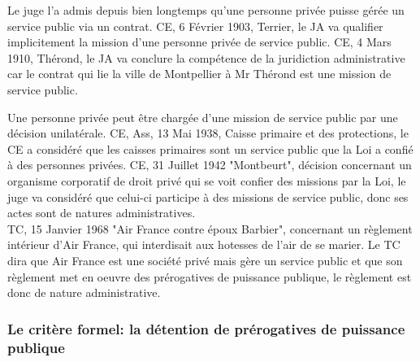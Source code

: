 \documentclass[10pt, a4paper, openany]{book}
\begin{document}
Le juge l'a admis depuis bien longtemps qu'une personne privée puisse gérée un service public via un contrat. CE, 6 Février 1903, Terrier, le JA va qualifier implicitement la mission d'une personne privée de service public. CE, 4 Mars 1910, Thérond, le JA va conclure la compétence de la juridiction administrative car le contrat qui lie la ville de Montpellier à Mr Thérond est une mission de service public. 


Une personne privée peut être chargée d'une mission de service public par une décision unilatérale. CE, Ass, 13 Mai 1938, Caisse primaire et des protections, le CE a considéré que les caisses primaires sont un service public que la Loi a confié à des personnes privées. CE, 31 Juillet 1942 "Montbeurt", décision concernant un organisme corporatif de droit privé qui se voit confier des missions par la Loi, le juge va considéré que celui-ci participe à des missions de service public, donc ses actes sont de natures administratives. \\
TC, 15 Janvier 1968 "Air France contre époux Barbier", concernant un règlement intérieur d'Air France, qui interdisait aux hotesses de l'air de se marier. Le TC dira que Air France est une société privé mais gère un service public et que son règlement met en oeuvre des prérogatives de puissance publique, le règlement est donc de nature administrative. 

\subsubsection{Le critère formel: la détention de prérogatives de puissance publique}
\end{document}
